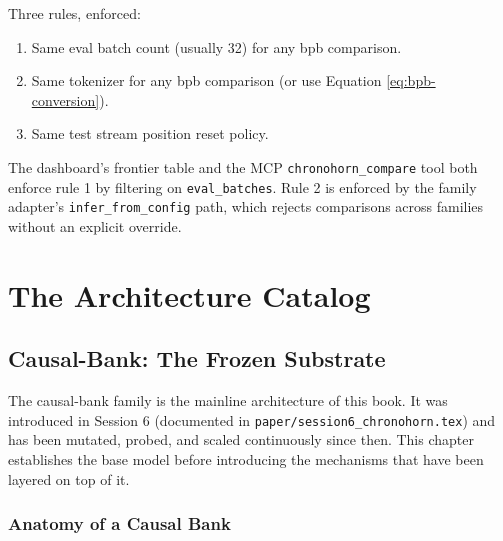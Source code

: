 \documentclass[11pt,openany]{book}
\theoremstyle{definition}
\theoremstyle{plain}
\begin{document}
Three rules, enforced:
\begin{enumerate}
  \item Same eval batch count (usually 32) for any bpb comparison.
  \item Same tokenizer for any bpb comparison (or use
    Equation \ref{eq:bpb-conversion}).
  \item Same test stream position reset policy.
\end{enumerate}

The dashboard's frontier table and the MCP \texttt{chronohorn\_compare} tool
both enforce rule 1 by filtering on \texttt{eval\_batches}. Rule 2 is
enforced by the family adapter's \texttt{infer\_from\_config} path, which
rejects comparisons across families without an explicit override.

\part{The Architecture Catalog}

\chapter{Causal-Bank: The Frozen Substrate}
\label{ch:causal-bank}

The causal-bank family is the mainline architecture of this book. It was
introduced in Session 6 (documented in \texttt{paper/session6\_chronohorn.tex})
and has been mutated, probed, and scaled continuously since then. This
chapter establishes the base model before introducing the mechanisms that
have been layered on top of it.

\section{Anatomy of a Causal Bank}
\end{document}
